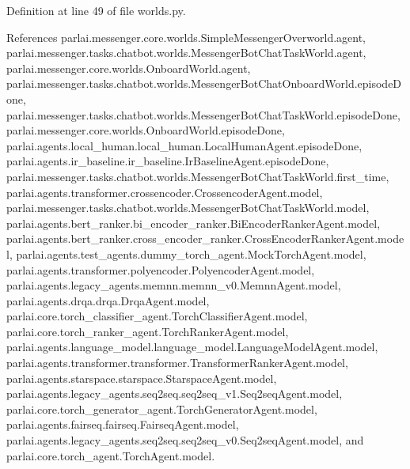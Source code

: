 Definition at line 49 of file worlds.\+py.



References parlai.\+messenger.\+core.\+worlds.\+Simple\+Messenger\+Overworld.\+agent, parlai.\+messenger.\+tasks.\+chatbot.\+worlds.\+Messenger\+Bot\+Chat\+Task\+World.\+agent, parlai.\+messenger.\+core.\+worlds.\+Onboard\+World.\+agent, parlai.\+messenger.\+tasks.\+chatbot.\+worlds.\+Messenger\+Bot\+Chat\+Onboard\+World.\+episode\+Done, parlai.\+messenger.\+tasks.\+chatbot.\+worlds.\+Messenger\+Bot\+Chat\+Task\+World.\+episode\+Done, parlai.\+messenger.\+core.\+worlds.\+Onboard\+World.\+episode\+Done, parlai.\+agents.\+local\+\_\+human.\+local\+\_\+human.\+Local\+Human\+Agent.\+episode\+Done, parlai.\+agents.\+ir\+\_\+baseline.\+ir\+\_\+baseline.\+Ir\+Baseline\+Agent.\+episode\+Done, parlai.\+messenger.\+tasks.\+chatbot.\+worlds.\+Messenger\+Bot\+Chat\+Task\+World.\+first\+\_\+time, parlai.\+agents.\+transformer.\+crossencoder.\+Crossencoder\+Agent.\+model, parlai.\+messenger.\+tasks.\+chatbot.\+worlds.\+Messenger\+Bot\+Chat\+Task\+World.\+model, parlai.\+agents.\+bert\+\_\+ranker.\+bi\+\_\+encoder\+\_\+ranker.\+Bi\+Encoder\+Ranker\+Agent.\+model, parlai.\+agents.\+bert\+\_\+ranker.\+cross\+\_\+encoder\+\_\+ranker.\+Cross\+Encoder\+Ranker\+Agent.\+model, parlai.\+agents.\+test\+\_\+agents.\+dummy\+\_\+torch\+\_\+agent.\+Mock\+Torch\+Agent.\+model, parlai.\+agents.\+transformer.\+polyencoder.\+Polyencoder\+Agent.\+model, parlai.\+agents.\+legacy\+\_\+agents.\+memnn.\+memnn\+\_\+v0.\+Memnn\+Agent.\+model, parlai.\+agents.\+drqa.\+drqa.\+Drqa\+Agent.\+model, parlai.\+core.\+torch\+\_\+classifier\+\_\+agent.\+Torch\+Classifier\+Agent.\+model, parlai.\+core.\+torch\+\_\+ranker\+\_\+agent.\+Torch\+Ranker\+Agent.\+model, parlai.\+agents.\+language\+\_\+model.\+language\+\_\+model.\+Language\+Model\+Agent.\+model, parlai.\+agents.\+transformer.\+transformer.\+Transformer\+Ranker\+Agent.\+model, parlai.\+agents.\+starspace.\+starspace.\+Starspace\+Agent.\+model, parlai.\+agents.\+legacy\+\_\+agents.\+seq2seq.\+seq2seq\+\_\+v1.\+Seq2seq\+Agent.\+model, parlai.\+core.\+torch\+\_\+generator\+\_\+agent.\+Torch\+Generator\+Agent.\+model, parlai.\+agents.\+fairseq.\+fairseq.\+Fairseq\+Agent.\+model, parlai.\+agents.\+legacy\+\_\+agents.\+seq2seq.\+seq2seq\+\_\+v0.\+Seq2seq\+Agent.\+model, and parlai.\+core.\+torch\+\_\+agent.\+Torch\+Agent.\+model.

\mbox{\label{classparlai_1_1messenger_1_1tasks_1_1chatbot_1_1worlds_1_1MessengerBotChatTaskWorld_a17adc8275479c35b5ccb46e803ce4e2a}} 
